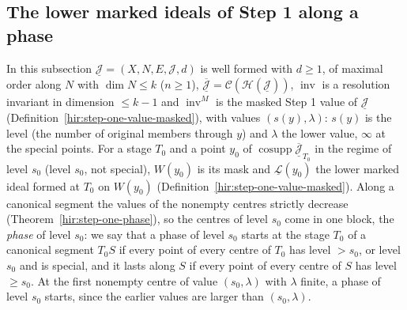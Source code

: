 \subsection{The lower marked ideals of Step 1 along a phase}

In this subsection \(\underline{\mathcal J}=(X,N,E,\mathcal J,d)\) is well formed with \(d\ge1\), of maximal order along \(N\) with \(\dim N\le k\) (\(n\ge1\)),
\(\overline{\underline{\mathcal J}}=\mathcal C(\mathcal H(\underline{\mathcal J}))\), \(\operatorname{inv}\) is a resolution invariant in dimension \(\le k-1\) and
\(\operatorname{inv}^M\) is the masked Step 1 value of \(\underline{\mathcal J}\) (Definition~\ref{hir:step-one-value-masked}), with values \((s(y),\lambda)\): \(s(y)\) is the level
(the number of original members through \(y\)) and \(\lambda\) the lower value, \(\infty\) at the special points. For a stage \(T_0\) and a point \(y_0\) of
\(\operatorname{cosupp}\overline{\underline{\mathcal J}}_{T_0}\) in the regime of level \(s_0\) (level \(s_0\), not special), \(W(y_0)\) is its mask and \(\underline{\mathcal L}(y_0)\) the
lower marked ideal formed at \(T_0\) on \(W(y_0)\) (Definition~\ref{hir:step-one-value-masked}). Along a canonical segment the values of the nonempty centres strictly
decrease (Theorem~\ref{hir:step-one-phase}), so the centres of level \(s_0\) come in one block, the \emph{phase} of level \(s_0\): we say that a phase of level \(s_0\)
starts at the stage \(T_0\) of a canonical segment \(T_0S\) if every point of every centre of \(T_0\) has level \(>s_0\), or level \(s_0\) and is special, and it lasts
along \(S\) if every point of every centre of \(S\) has level \(\ge s_0\). At the first nonempty centre of value \((s_0,\lambda)\) with \(\lambda\) finite, a phase of level
\(s_0\) starts, since the earlier values are larger than \((s_0,\lambda)\).

